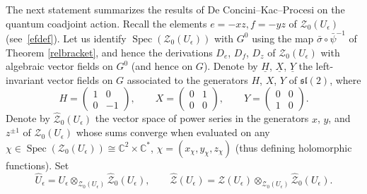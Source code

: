 \documentclass[pdftex]{sigma}%
\numberwithin{equation}{section}
\numberwithin{figure}{section}
\newcommand{\Ue}{U_\epsilon}
\newcommand{\e}{\epsilon}
\newcommand{\mc}{\mathbb{C}}
\begin{document}
The next statement summarizes the results of De Concini--Kac--Procesi on the quantum coadjoint action. Recall the elements $e= -xz, f=-yz$ of $\mathcal{Z}_0(U_\epsilon)$ (see~\eqref{efdef}). Let us identify $\operatorname{Spec}(\mathcal{Z}_0(U_\epsilon))$ with $G^0$ using the map $\bar{\sigma} \circ \bar{\psi}^{-1}$ of Theorem \ref{relbracket}, and hence the derivations $D_e$, $D_f$, $D_z$ of $\mathcal{Z}_0(U_\epsilon)$ with algebraic vector fields on $G^0$ (and hence on $G$). Denote by $\underline{H}$, $\underline{X}$, $\underline{Y}$ the left-invariant vector fields on $G$ associated to the generators $H$, $X$, $Y$ of ${\mathfrak{sl}}(2)$, where
\[
H = \begin{pmatrix} 1 & 0\\ 0& -1 \end{pmatrix}\!,\qquad
X = \begin{pmatrix} 0 & 1\\ 0& 0 \end{pmatrix}\!,\qquad
Y=\begin{pmatrix} 0 & 0\\ 1&0 \end{pmatrix}\!.
\]
Denote by $\hat{\mathcal{Z}}_0(U_\epsilon)$ the vector space of power series in the generators $x$, $y$, and $z^{\pm 1}$ of $\mathcal{Z}_0(U_\epsilon)$ whose sums converge when evaluated on any $\chi\in \operatorname{Spec}(\mathcal{Z}_0(U_\e))\cong \mc^2\times \mc^*$, $\chi =(x_\chi,y_\chi,z_\chi)$ (thus defining holomorphic functions). Set
\begin{equation*}%
\hat{U}_\e = \Ue \otimes_{\mathcal{Z}_0(U_\epsilon)} \hat{\mathcal{Z}}_0(U_\epsilon),\qquad \hat{\mathcal{Z}}(\Ue) = \mathcal{Z}(U_\e) \otimes_{\mathcal{Z}_0(U_\epsilon)} \hat{\mathcal{Z}}_0(U_\epsilon).
\end{equation*}
\end{document}
